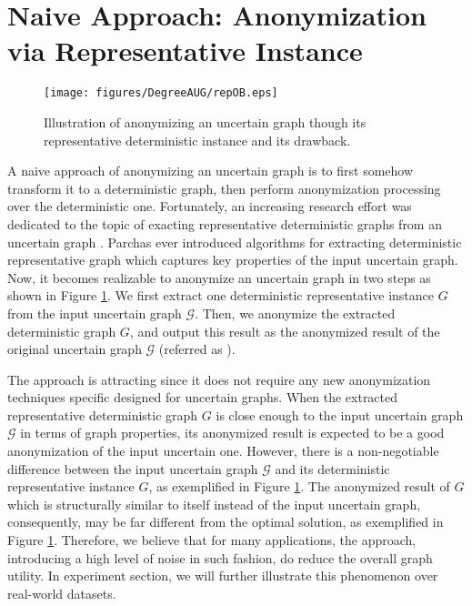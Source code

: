 \section{Naive Approach: Anonymization via Representative Instance}
\label{sec:repOB}
\begin{figure}[t]
    \centering  
        \texttt{[image: figures/DegreeAUG/repOB.eps]}
    	\caption{Illustration of anonymizing an uncertain graph though its representative deterministic instance and its drawback.}
    \label{fig:repOB}
\end{figure}
A naive approach of anonymizing an uncertain graph is to first somehow transform it to a deterministic graph, then perform anonymization processing over the deterministic one. Fortunately, an increasing research effort was dedicated to the topic of exacting representative deterministic graphs from an uncertain graph \cite{Parchas_Gullo_Papadias_Bonchi_2014}. Parchas  {\etal} \cite{Parchas_Gullo_Papadias_Bonchi_2014} ever introduced algorithms for extracting deterministic representative graph which captures key properties of the input uncertain graph. Now, it becomes realizable to anonymize an uncertain graph in two steps as shown in Figure \ref{fig:repOB}. We first extract one deterministic representative instance $G$ from the input uncertain graph $\mathcal{G}$. Then, we anonymize the extracted deterministic graph $G$, and output this result as the anonymized result of the original uncertain graph $\mathcal{G}$ (referred as {\repAn}). 

The {\repAn} approach is attracting since it does not require any new anonymization techniques specific designed for uncertain graphs. When the extracted representative deterministic graph $G$ is close enough to the input uncertain graph $\mathcal{G}$ in terms of graph properties, its anonymized result is expected to be a good anonymization of the input uncertain one. However, there is a non-negotiable difference between the input uncertain graph $\mathcal{G}$ and its deterministic representative instance $G$, as exemplified in Figure \ref{fig:repOB}. The anonymized result of $G$ which is structurally similar to itself instead of the input uncertain graph, consequently, may be far different from the optimal solution, as exemplified in Figure \ref{fig:repOB}. Therefore, we believe that for many applications, the {\repAn} approach,  introducing a high level of noise in such fashion, do reduce the overall graph utility.  In experiment section, we will further illustrate this phenomenon over real-world datasets. 